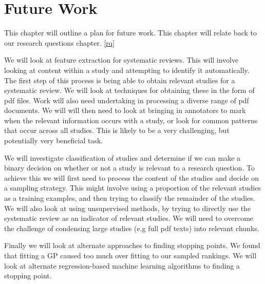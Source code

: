 \chapter{Future Work} \label{fw}

This chapter will outline a plan for future work. This chapter will relate back to our research questions chapter. \ref{rq}

We will look at feature extraction for systematic reviews. This will involve looking at content within a study and attempting to identify it automatically. The first step of this process is being able to obtain relevant studies for a systematic review. We will look at techniques for obtaining these in the form of pdf files. Work will also need undertaking in processing a diverse range of pdf documents. We will will then need to look at bringing in annotators to mark when the relevant information occurs with a study, or look for common patterns that occur across all studies. This is likely to be a very challenging, but potentially very beneficial task.


We will investigate classification of studies and determine if we can make a binary decision on whether or not a study is relevant to a research question. To achieve this we will first need to process the content of the studies and decide on a sampling strategy. This might involve using a proportion of the relevant studies as a training examples, and then trying to classify the remainder of the studies. We will also look at using unsupervised methods, by trying to directly use the systematic review as an indicator of relevant studies. We will need to overcome the challenge of condensing large studies (e.g full pdf texts) into relevant chunks.

Finally we will look at alternate approaches to finding stopping points. We found that fitting a GP caused too much over fitting to our sampled rankings. We will look at alternate regression-based machine learning algorithms to finding a stopping point.




